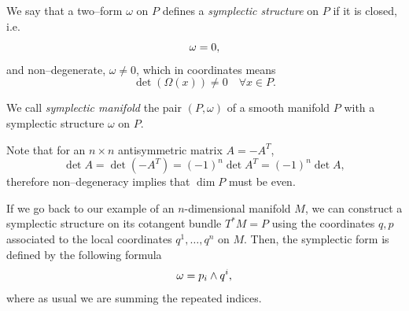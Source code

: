 \documentclass[english,fontsize=11pt,paper=a5,oneside]{scrbook}
\let\d\relax
\newcommand{\d}{\mathrm{d}}
\theoremstyle{definition}
\newenvironment{remark}
  {\pushQED{\qed}\renewcommand{\qedsymbol}{$\lozenge$}\remarkx}
  {\popQED\endremarkx}
\begin{document}
\begin{tcolorbox}
  We say that a two--form $\omega$ on $P$ defines a \emph{symplectic structure} on $P$ if it is closed, i.e.
  \begin{equation}
    \d\omega = 0,
  \end{equation}
  and non--degenerate, $\omega \neq 0$, which in coordinates means
  \begin{equation}
    \det (\Omega(x)) \neq 0 \quad \forall x\in P.
  \end{equation}

  We call \emph{symplectic manifold} the pair $(P, \omega)$ of a smooth manifold $P$ with a symplectic structure $\omega$ on $P$.
\end{tcolorbox}

\begin{remark}
  Note that for an $n\times n$ antisymmetric matrix $A = - A^T$,
  \begin{equation}
    \det A = \det (-A^T) = (-1)^n \det A^T =  (-1)^n \det A,
  \end{equation}
  therefore non--degeneracy implies that $\dim P$ must be even.
\end{remark}

If we go back to our example of an $n$-dimensional manifold $M$, we can construct a symplectic structure on its cotangent bundle $T^*M = P$ using the coordinates $q,p$ associated to the local coordinates $q^1, \ldots, q^n$ on $M$.
Then, the symplectic form is defined by the following formula
\begin{equation}\label{eq:canonical2form}
  \omega = \d p_i \wedge \d q^i,
\end{equation}
where as usual we are summing the repeated indices.
\end{document}
